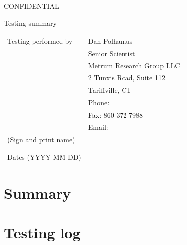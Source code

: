 \documentclass{article}
\newcommand{\topic}{Testing summary}
\begin{document}
\vspace*{1cm}
\begin{center}
{\large CONFIDENTIAL}


\vspace*{1cm}


\vspace*{1cm}

{\Large \topic}
\vspace{3.0cm}
\end{center}

\newpage
\vspace*{1cm}
\begin{center}
\vspace{3.0cm}

\begin{tabular}{|l|l|}\hline
Testing performed by &   Dan Polhamus\\
                      &  Senior Scientist \\
                      &  Metrum Research Group LLC \\
                      &  2 Tunxis Road, Suite 112\\
                      &  Tariffville, CT\\
                      &  Phone:  \\
                      &  Fax: 860-372-7988 \\
                      &  Email:  \\\hline
 (Sign and print name) & \\
                       & \\
                       & \\\hline
Dates (YYYY-MM-DD)     &               \\\hline



\end{tabular}

\end{center}

\newpage

\tableofcontents
\listoffigures

\newpage

\section*{Summary}


\section*{Testing log}
\end{document}

